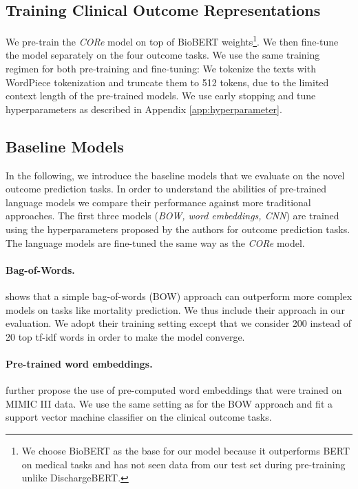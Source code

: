 \documentclass[11pt,a4paper]{article}
\begin{document}
\subsection{Training Clinical Outcome Representations} We pre-train the \textit{CORe} model on top of BioBERT weights\footnote{We choose BioBERT as the base for our model because it outperforms BERT on medical tasks and has not seen data from our test set during pre-training unlike DischargeBERT.}. We then fine-tune the model separately on the four outcome tasks. We use the same training regimen for both pre-training and fine-tuning: We tokenize the texts with WordPiece tokenization and truncate them to 512 tokens, due to the limited context length of the pre-trained models. We use early stopping and tune hyperparameters as described in Appendix \ref{app:hyperparameter}.

\subsection{Baseline Models} \label{section:baselines} In the following, we introduce the baseline models that we evaluate on the novel outcome prediction tasks. In order to understand the abilities of pre-trained language models we compare their performance against more traditional approaches. The first three models (\textit{BOW, word embeddings, CNN}) are trained using the hyperparameters proposed by the authors for outcome prediction tasks. The language models are fine-tuned the same way as the \textit{CORe} model. 

\paragraph{Bag-of-Words.}
\citet{whats-in-a-note} shows that a simple bag-of-words (BOW) approach can outperform more complex models on tasks like mortality prediction. We thus include their approach in our evaluation. We adopt their training setting except that we consider 200 instead of 20 top tf-idf words in order to make the model converge.

\paragraph{Pre-trained word embeddings.} \citet{whats-in-a-note} further propose the use of pre-computed word embeddings that were trained on MIMIC III data. We use the same setting as for the BOW approach and fit a support vector machine classifier on the clinical outcome tasks.
\end{document}
